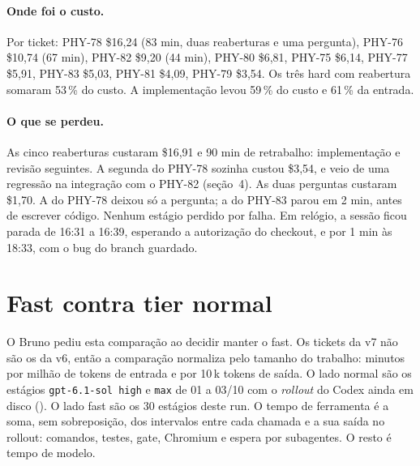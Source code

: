 \documentclass[11pt,a4paper]{article}
\begin{document}
\paragraph{Onde foi o custo.} Por ticket: PHY-78 \$16,24 (83 min, duas
reaberturas e uma pergunta), PHY-76 \$10,74 (67 min), PHY-82 \$9,20 (44 min),
PHY-80 \$6,81, PHY-75 \$6,14, PHY-77 \$5,91, PHY-83 \$5,03, PHY-81 \$4,09,
PHY-79 \$3,54. Os três hard com reabertura somaram 53\,\% do custo. A
implementação levou 59\,\% do custo e 61\,\% da entrada.

\paragraph{O que se perdeu.} As cinco reaberturas custaram \$16,91 e 90 min de
retrabalho: implementação e revisão seguintes. A segunda do PHY-78 sozinha
custou \$3,54, e veio de uma regressão na integração com o PHY-82 (seção~4).
As duas perguntas custaram \$1,70. A do PHY-78 deixou só a pergunta; a do PHY-83
parou em 2 min, antes de escrever código. Nenhum estágio perdido por falha. Em
relógio, a sessão ficou parada de 16:31 a 16:39, esperando a autorização do
checkout, e por 1 min às 18:33, com o bug do branch guardado.

\section{Fast contra tier normal}

O Bruno pediu esta comparação ao decidir manter o fast. Os tickets da v7 não
são os da v6, então a comparação normaliza pelo tamanho do trabalho: minutos
por milhão de tokens de entrada e por 10\,k tokens de saída. O lado normal são
os estágios \texttt{gpt-6.1-sol high} e \texttt{max} de 01 a 03/10 com o
\emph{rollout} do Codex ainda em disco (). O lado fast
são os 30 estágios deste run. O tempo de ferramenta é a soma, sem
sobreposição, dos intervalos entre cada chamada e a sua saída no rollout:
comandos, testes, gate, Chromium e espera por subagentes. O resto é tempo de
modelo.
\end{document}
